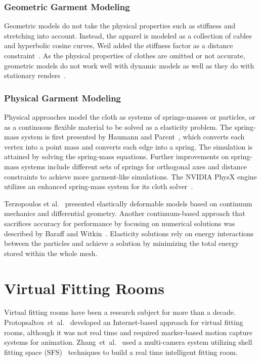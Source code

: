 \subsubsection{Geometric Garment Modeling}
Geometric models do not take the physical properties such as stiffness and stretching into account. Instead, the apparel is modeled as a collection of cables and hyperbolic cosine curves, Weil added the stiffness factor as a distance constraint~\cite{Weil1986}. As the physical properties of clothes are omitted or not accurate, geometric models do not work well with dynamic models as well as they do with stationary renders~\cite{Weil1986}.

\subsubsection{Physical Garment Modeling}
Physical approaches model the cloth as systems of springs-masses or particles, or as a continuous flexible material to be solved as a elasticity problem. The spring-mass system is first presented by Haumann and Parent~\cite{Haumann1988}, which converts each vertex into a point mass and converts each edge into a spring. The simulation is attained by solving the spring-mass equations. Further improvements on spring-mass systems include different sets of springs for orthogonal axes and distance constraints to achieve more garment-like simulations\cite{Provot1996}. The NVIDIA PhysX engine utilizes an enhanced spring-mass system for its cloth solver~\cite{Kim2011}.

Terzopoulos et al.~\cite{Terzopoulos1987} presented elastically deformable models based on continuum mechanics and differential geometry. Another continuum-based approach that sacrifices accuracy for performance by focusing on numerical solutions was described by Baraff and Witkin~\cite{Baraff1998}. Elasticity solutions rely on energy interactions between the particles and achieve a solution by minimizing the total energy stored within the whole mesh.

\section{Virtual Fitting Rooms}
\label{section_related_virtual_fitting}

Virtual fitting rooms have been a research subject for more than a decade. Protopsaltou~et~al.~\cite{Protopsaltou2002} developed an Inter\-net-based approach for virtual fitting rooms, although it was not real time and required marker-based motion capture systems for animation. Zhang~et~al.~\cite{Zhang2008} used a multi-camera system utilizing shell fitting space (SFS)~\cite{Cheung2005} techniques to build a real time intelligent fitting room.

